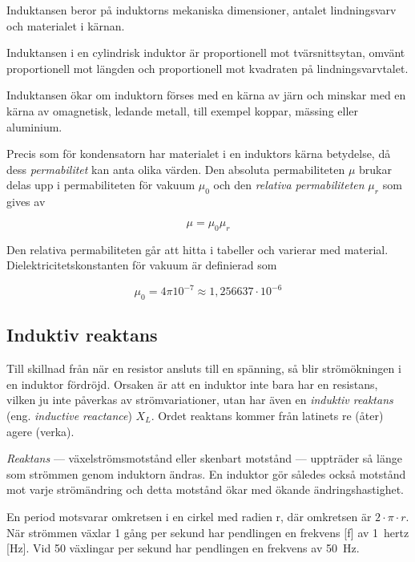 Induktansen beror på induktorns mekaniska dimensioner, antalet lindningsvarv och
materialet i kärnan.

Induktansen i en cylindrisk induktor är proportionell mot tvärsnittsytan, omvänt
proportionell mot längden och proportionell mot kvadraten på lindningsvarvtalet.

Induktansen ökar om induktorn förses med en kärna av järn och minskar med en
kärna av omagnetisk, ledande metall, till exempel koppar, mässing eller aluminium.

Precis som för kondensatorn har materialet i en induktors kärna betydelse,
då dess \emph{permabilitet} kan anta olika värden. Den absoluta permabiliteten
\(\mu\) brukar delas upp i permabiliteten för vakuum \(\mu_0\) och den
\emph{relativa permabiliteten} \(\mu_r\) som gives av

\[ \mu = \mu_0\mu_r \]

Den relativa permabiliteten går att hitta i tabeller och varierar med material.
Dielektricitetskonstanten för vakuum är definierad som

\[ \mu_0 = 4\pi 10^{-7} \approx 1,256637 \cdot 10^{-6} \]

\subsection{Induktiv reaktans}

Till skillnad från när en resistor ansluts till en spänning, så blir
strömökningen i en induktor fördröjd. Orsaken är att en induktor inte bara har
en resistans, vilken ju inte påverkas av strömvariationer, utan har även en
\emph{induktiv reaktans} (eng. \emph{inductive reactance}) \(X_L\). Ordet
reaktans kommer från latinets re (åter) agere (verka).

\emph{Reaktans} --- växelströmsmotstånd eller skenbart motstånd --- uppträder så
länge som strömmen genom induktorn ändras. En induktor gör således också
motstånd mot varje strömändring och detta motstånd ökar med ökande
ändringshastighet.


En period motsvarar omkretsen i en cirkel med radien r, där omkretsen är \(2
\cdot \pi \cdot r\). När strömmen växlar 1 gång per sekund har pendlingen en
frekvens [f] av 1~hertz [Hz]. Vid 50 växlingar per sekund har pendlingen en
frekvens av 50~Hz.

